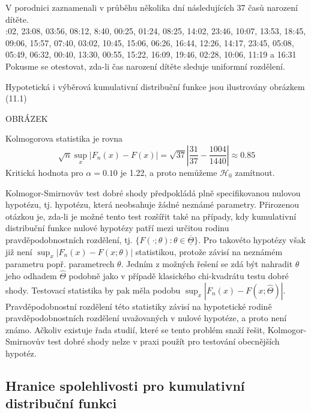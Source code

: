 \begin{example}
V porodnici zaznamenali v průběhu několika dní následujících 37 časů narození dítěte.\\

:02, 23:08, 03:56, 08:12, 8:40, 00:25, 01:24, 08:25, 14:02, 23:46, 10:07, 13:53, 18:45, 09:06, 15:57, 07:40, 03:02, 10:45, 15:06, 06:26, 16:44, 12:26, 14:17, 23:45, 05:08, 05:49, 06:32, 00:40, 13:30, 00:55, 15:22, 16:09, 19:46, 02:28, 10:06, 11:19 a 16:31\\

\noindent Pokusme se otestovat, zda-li čas narození dítěte sleduje uniformní rozdělení.

Hypotetická i výběrová kumulativní distribuční funkce jsou ilustrovány obrázkem (11.1)

OBRÁZEK

Kolmogorova statistika je rovna
\begin{equation*}
\sqrt{n} \sup_x |F_n(x) - F(x)| = \sqrt{37}|\frac{31}{37} - \frac{1004}{1440}| \approx 0.85
\end{equation*}
Kritická hodnota pro $\alpha = 0.10$ je 1.22, a proto nemůžeme $\mathscr{H}_0$ zamítnout.
\end{example}

Kolmogor-Smirnovův test dobré shody předpokládá plně specifikovanou nulovou hypotézu, tj. hypotézu, která neobsahuje žádné neznámé parametry. Přirozenou otázkou je, zda-li je možné tento test rozšířit také na případy, kdy kumulativní distribuční funkce nulové hypotézy patří mezi určitou rodinu pravděpodobnostních rozdělení, tj. $\{F(\cdot; \theta): \theta \in \overline{\underline{\Theta}} \}$. Pro takovéto hypotézy však již není $\sup_x|F_n(x) - F(x; \theta)|$ statistikou, protože závisí na neznámém parametru popř. parametrech $\theta$. Jedním z možných řešení se zdá být nahradit $\theta$ jeho odhadem $\hat{\Theta}$ podobně jako v případě klasického chi-kvadrátu testu dobré shody. Testovací statistika by pak měla podobu $\sup_x|F_n(x) - F(x;\hat{\Theta})|$. Pravděpodobnostní rozdělení této statistiky závisí na hypotetické rodině pravděpodobnostních rozdělení uvažovaných v nulové hypotéze, a proto není známo. Ačkoliv existuje řada studií, které se tento problém snaží řešit, Kolmogor-Smirnovův test dobré shody nelze v praxi použít pro testování obecnějších hypotéz.

\subsection{Hranice spolehlivosti pro kumulativní distribuční funkci}

